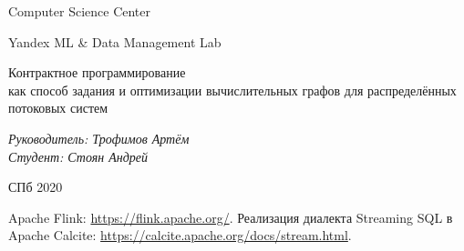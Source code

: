 \documentclass[a4paper,12pt]{article}
\begin{document}
\thispagestyle{empty}
\begin{center}
    Computer Science Center

    Yandex ML \& Data Management Lab
\end{center}
\vspace{13ex}

\begin{center}
    \vspace{16ex}
    \begin{spacing}{1.5}
        {\Large Контрактное программирование \\как способ задания и оптимизации вычислительных графов для распределённых потоковых систем}
    \end{spacing}
\end{center}
\vfill
\begin{flushright}
    \noindent
    \textit{Руководитель: Трофимов Артём} \\
    \textit{Студент: Стоян Андрей}
\end{flushright}
\vspace{5ex}
\begin{center}
    СПб 2020
\end{center}
\newpage

\tableofcontents
\newpage


\newpage

\newpage









\begin{thebibliography}{9}  %
     Apache Flink: \url{https://flink.apache.org/}.
     Реализация диалекта Streaming SQL в Apache Calcite: \url{https://calcite.apache.org/docs/stream.html}.
\end{thebibliography}
\end{document}
